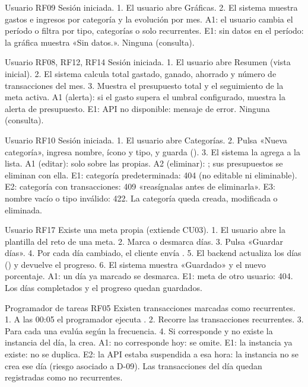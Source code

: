 {Usuario}
{RF09}
{Sesión iniciada.}
{1. El usuario abre Gráficas. 2. El sistema muestra gastos e ingresos por categoría y la evolución por mes.}
{A1: el usuario cambia el período o filtra por tipo, categorías o solo recurrentes.}
{E1: sin datos en el período: la gráfica muestra «Sin datos.».}
{Ninguna (consulta).}

{Usuario}
{RF08, RF12, RF14}
{Sesión iniciada.}
{1. El usuario abre Resumen (vista inicial). 2. El sistema calcula total gastado, ganado, ahorrado y número de transacciones del mes. 3. Muestra el presupuesto total y el seguimiento de la meta activa.}
{A1 (alerta): si el gasto supera el umbral configurado, muestra la alerta de presupuesto.}
{E1: API no disponible: mensaje de error.}
{Ninguna (consulta).}

{Usuario}
{RF10}
{Sesión iniciada.}
{1. El usuario abre Categorías. 2. Pulsa «Nueva categoría», ingresa nombre, ícono y tipo, y guarda (). 3. El sistema la agrega a la lista.}
{A1 (editar):  solo sobre las propias. A2 (eliminar): ; sus presupuestos se eliminan con ella.}
{E1: categoría predeterminada: 404 (no editable ni eliminable). E2: categoría con transacciones: 409 «reasígnalas antes de eliminarla». E3: nombre vacío o tipo inválido: 422.}
{La categoría queda creada, modificada o eliminada.}

{Usuario}
{RF17}
{Existe una meta propia (extiende CU03).}
{1. El usuario abre la plantilla del reto de una meta. 2. Marca o desmarca días. 3. Pulsa «Guardar días». 4. Por cada día cambiado, el cliente envía . 5. El backend actualiza los días () y devuelve el progreso. 6. El sistema muestra «Guardado» y el nuevo porcentaje.}
{A1: un día ya marcado se desmarca.}
{E1: meta de otro usuario: 404.}
{Los días completados y el progreso quedan guardados.}

{Programador de tareas}
{RF05}
{Existen transacciones marcadas como recurrentes.}
{1. A las 00:05 el programador ejecuta . 2. Recorre las transacciones recurrentes. 3. Para cada una evalúa  según la frecuencia. 4. Si corresponde y no existe la instancia del día, la crea.}
{A1: no corresponde hoy: se omite.}
{E1: la instancia ya existe: no se duplica. E2: la API estaba suspendida a esa hora: la instancia no se crea ese día (riesgo asociado a D-09).}
{Las transacciones del día quedan registradas como no recurrentes.}

